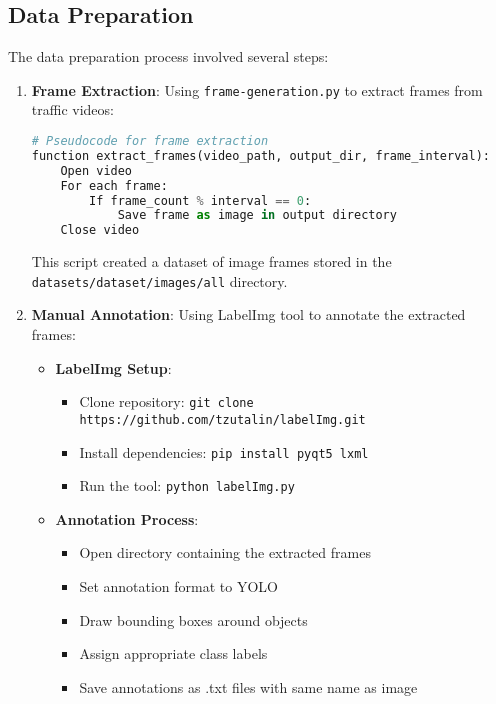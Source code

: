 \documentclass[9pt,a4paper,twoside]{rho-class/rho}
\begin{document}
    \subsection{Data Preparation}
    
    The data preparation process involved several steps:
    
    \begin{enumerate}
        \item \textbf{Frame Extraction}: Using \texttt{frame-generation.py} to extract frames from traffic videos:
        \begin{lstlisting}[caption=Pseudocode for frame extraction, language=Python]
# Pseudocode for frame extraction
function extract_frames(video_path, output_dir, frame_interval):
    Open video
    For each frame:
        If frame_count % interval == 0:
            Save frame as image in output directory
    Close video
        \end{lstlisting}
        This script created a dataset of image frames stored in the \texttt{datasets/dataset/images/all} directory.
        
        \item \textbf{Manual Annotation}: Using LabelImg tool to annotate the extracted frames:
        \begin{itemize}
            \item \textbf{LabelImg Setup}:
            \begin{itemize}
                \item Clone repository: \texttt{git clone https://github.com/tzutalin/labelImg.git}
                \item Install dependencies: \texttt{pip install pyqt5 lxml}
                \item Run the tool: \texttt{python labelImg.py}
            \end{itemize}
            \item \textbf{Annotation Process}:
            \begin{itemize}
                \item Open directory containing the extracted frames
                \item Set annotation format to YOLO
                \item Draw bounding boxes around objects
                \item Assign appropriate class labels
                \item Save annotations as .txt files with same name as image
            \end{itemize}
        \end{itemize}
        

\end{enumerate}
\end{document}
